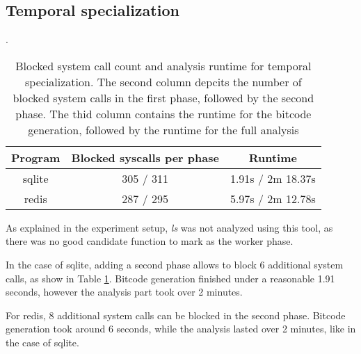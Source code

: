 \subsection {Temporal specialization}
\begin{table}[!h]
\begin{center}
\caption{Blocked system call count and analysis runtime for temporal specialization. The second column depcits the number of blocked system calls in the first phase, followed by the second phase. The thid column contains the runtime for the bitcode generation, followed by the runtime for the full analysis}.
\label{tbl:tmp_spec_results}
\begin{tabular}{||c c c||}
 \hline
 Program & Blocked syscalls per phase & Runtime \\
 \hline\hline
 sqlite & 305 / 311 & 1.91s / 2m 18.37s \\
 \hline
 redis & 287 / 295 & 5.97s / 2m 12.78s \\
 \hline
\end{tabular}
\end{center}
\end{table}
As explained in the experiment setup, \textit{ls} was not analyzed using this tool, as there was no good candidate function to mark as the worker phase.

In the case of sqlite, adding a second phase allows to block 6 additional system calls, as show in Table \ref{tbl:tmp_spec_results}. Bitcode generation finished under a reasonable 1.91 seconds, however the analysis part took over 2 minutes.

For redis, 8 additional system calls can be blocked in the second phase. Bitcode generation took around 6 seconds, while the analysis lasted over 2 minutes, like in the case of sqlite.
